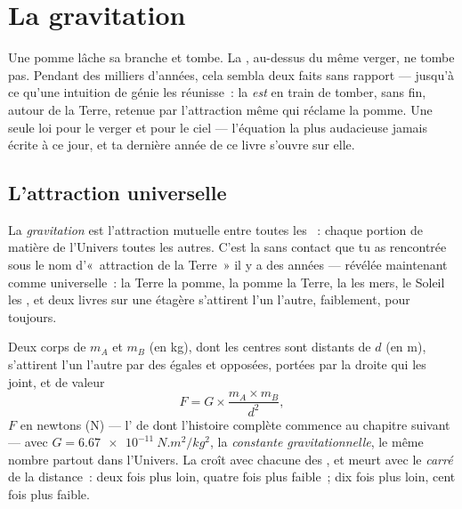 \chapter{La gravitation}\label{ch:g9:gravitation}

Une pomme lâche sa branche et tombe. La , au-dessus du même
verger, ne tombe pas. Pendant des milliers d'années, cela sembla deux
faits sans rapport --- jusqu'à ce qu'une intuition de génie les
réunisse~: la  \emph{est} en train de tomber, sans fin, autour de
la Terre, retenue par l'attraction même qui réclame la pomme. Une
seule loi pour le verger et pour le ciel --- l'équation la plus
audacieuse jamais écrite à ce jour, et ta dernière année de ce livre
s'ouvre sur elle.

\section{L'attraction universelle}

\begin{definition}[Gravitation]\label{def:g9:gravitation:gravitation}
La \emph{gravitation} est l'attraction mutuelle
entre toutes les ~: chaque portion de matière de l'Univers
 toutes les autres. C'est la  sans contact que tu as
rencontrée sous le nom d'«~attraction de la Terre~» il y a des années
--- révélée maintenant comme universelle~: la Terre  la pomme,
la pomme  la Terre, la   les mers, le Soleil 
les , et deux livres sur une étagère s'attirent l'un l'autre,
faiblement, pour toujours.
\end{definition}

\begin{proposition}\label{prop:g9:gravitation:law}
Deux corps de  $m_A$ et $m_B$ (en \unit{kg}), dont les centres
sont distants de $d$ (en \unit{m}), s'attirent l'un l'autre par des
 égales et opposées, portées par la droite qui les joint, et de
valeur
\[
F = G \times \frac{m_A \times m_B}{d^2},
\]
$F$ en newtons (\unit{N}) --- l' de  dont l'histoire
complète commence au chapitre suivant --- avec
$G = \qty{6.67e-11}{N.m^2/kg^2}$, la \emph{constante
gravitationnelle}, le même nombre partout dans l'Univers. La 
croît avec chacune des , et meurt avec le \emph{carré} de la
distance~: deux fois plus loin, quatre fois plus faible~; dix fois
plus loin, cent fois plus faible.
\end{proposition}

